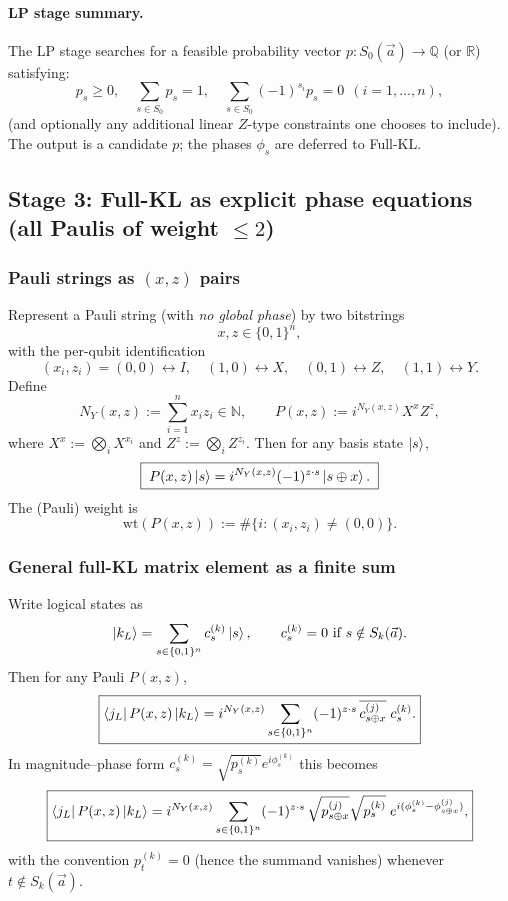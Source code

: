 \documentclass[11pt]{article}
\begin{document}
\paragraph{LP stage summary.}
The LP stage searches for a feasible probability vector \(p:S_0(\vec a)\to\mathbb{Q}\) (or \(\mathbb{R}\)) satisfying:
\[
p_s\ge 0,\quad \sum_{s\in S_0}p_s=1,\quad \sum_{s\in S_0}(-1)^{s_i}p_s=0\ \ (i=1,\dots,n),
\]
(and optionally any additional linear \(Z\)-type constraints one chooses to include).
The output is a candidate \(p\); the phases \(\phi_s\) are deferred to Full-KL.

\subsection{Stage 3: Full-KL as explicit phase equations (all Paulis of weight \(\le 2\))}

\subsubsection{Pauli strings as \((x,z)\) pairs}

Represent a Pauli string (with \emph{no global phase}) by two bitstrings
\[
x,z\in\{0,1\}^n,
\]
with the per-qubit identification
\[
(x_i,z_i)=(0,0)\leftrightarrow I,\quad
(1,0)\leftrightarrow X,\quad
(0,1)\leftrightarrow Z,\quad
(1,1)\leftrightarrow Y.
\]
Define
\[
N_Y(x,z):=\sum_{i=1}^n x_i z_i\in\mathbb{N},
\qquad
P(x,z):= i^{N_Y(x,z)}X^x Z^z,
\]
where \(X^x:=\bigotimes_i X^{x_i}\) and \(Z^z:=\bigotimes_i Z^{z_i}\).
Then for any basis state \(\ket{s}\),
\[
\boxed{\;P(x,z)\ket{s}=i^{N_Y(x,z)}(-1)^{z\cdot s}\ket{s\oplus x}.\;}
\]
The (Pauli) weight is
\[
\mathrm{wt}(P(x,z)):=\#\{i:(x_i,z_i)\neq(0,0)\}.
\]

\subsubsection{General full-KL matrix element as a finite sum}

Write logical states as
\[
\ket{k_L}=\sum_{s\in\{0,1\}^n} c^{(k)}_s\ket{s},
\qquad c^{(k)}_s=0\ \text{if }s\notin S_k(\vec a).
\]
Then for any Pauli \(P(x,z)\),
\[
\boxed{
\bra{j_L}P(x,z)\ket{k_L}
=i^{N_Y(x,z)}\sum_{s\in\{0,1\}^n}(-1)^{z\cdot s}\,
\overline{c^{(j)}_{s\oplus x}}\;c^{(k)}_{s}.
}
\]
In magnitude--phase form \(c^{(k)}_s=\sqrt{p^{(k)}_s}e^{i\phi^{(k)}_s}\) this becomes
\[
\boxed{
\bra{j_L}P(x,z)\ket{k_L}
=i^{N_Y(x,z)}\sum_{s\in\{0,1\}^n}(-1)^{z\cdot s}\,
\sqrt{p^{(j)}_{s\oplus x}}\sqrt{p^{(k)}_{s}}\;
e^{i(\phi^{(k)}_{s}-\phi^{(j)}_{s\oplus x})},
}
\]
with the convention \(p^{(k)}_t=0\) (hence the summand vanishes) whenever \(t\notin S_k(\vec a)\).
\end{document}
